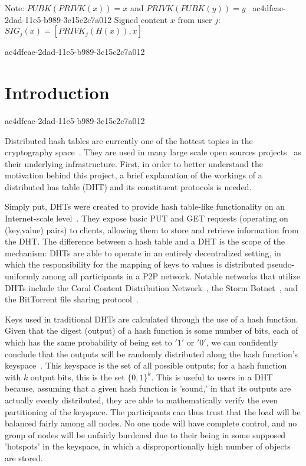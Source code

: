 \documentclass[12pt]{article}
\begin{document}
Note: $PUBK(PRIVK(x)) = x$ and $PRIVK(PUBK(y)) = y$~
ac4dfeae-2dad-11e5-b989-3c15c2c7a012
Signed content $x$ from user $j$: $SIG_j(x) = \left[ PRIVK_j( H(x) ), x \right]$

ac4dfeae-2dad-11e5-b989-3c15c2c7a012\section{Introduction}
ac4dfeae-2dad-11e5-b989-3c15c2c7a012\par Distributed hash tables are currently one of the hottest topics in the cryptography space~\cite{Stoica:2001dj,Rowstron:2001ea,Ratnasamy:2001wn}. They are used in many large scale open sources projects~\cite{Freitas:2013tb,Xu:2010vs,Perfitt:2010fh} as their underlying infrastructure. First, in order to better understand the motivation behind this project, a brief explanation of the workings of a distributed has table (DHT) and its constituent protocols is needed.

\par Simply put, DHTs were created to provide hash table-like functionality on an Internet-scale level~\cite{Ratnasamy:2001wn}. They expose basic PUT and GET requests (operating on (key,value) pairs) to clients, allowing them to store and retrieve information from the DHT. The difference between a hash table and a DHT is the scope of the mechanism: DHTs are able to operate in an entirely decentralized setting, in which the responsibility for the mapping of keys to values is distributed pseudo-uniformly among all participants in a P2P network. Notable networks that utilize DHTs include the Coral Content Distribution Network~\cite{Freedman:2004vb}, the Storm Botnet~\cite{Holz:2008uk}, and the BitTorrent file sharing protocol~\cite{Cohen:y1_8mBnw}.

\par Keys used in traditional DHTs are calculated through the use of a hash function. Given that the digest (output) of a hash function is some number of bits, each of which has the same probability of being set to $'1'$ or $'0'$, we can confidently conclude that the outputs will be randomly distributed along the hash function's keyspace~. This keyspace is the set of all possible outputs; for a hash function with $k$ output bits, this is the set $\{0,1\}^k$. This is useful to users in a DHT because, assuming that a given hash function is 'sound,' in that its outputs are actually evenly distributed, they are able to mathematically verify the even partitioning of the keyspace. The participants can thus trust that the load will be balanced fairly among all nodes. No one node will have complete control, and no group of nodes will be unfairly burdened due to their being in some supposed 'hotspots' in the keyspace, in which a disproportionally high number of objects are stored.~
\end{document}
